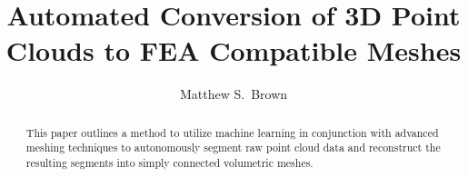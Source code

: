\documentclass[12pt]{drexelthesis}
\title{Automated Conversion of 3D Point Clouds to FEA Compatible Meshes}
\author{Matthew S.~Brown}
\begin{document}
\maketitle
\begin{preliminary}

\newpage

\setcounter{page}{2}

\date{} %

\begin{dedication}

\end{dedication}

\begin{acknowledgements}

\end{acknowledgements}


\mytableofcontents\newpage


\setlength{\baselineskip}{0.5\baselineskip}
\listoftables \newpage


\listoffigures \newpage
\setlength{\baselineskip}{2.0\baselineskip}

\begin{abstract}
This paper outlines a method to utilize machine learning in conjunction with advanced meshing techniques to autonomously segment raw point cloud data and reconstruct the resulting segments into simply connected volumetric meshes.

\end{abstract}

\clearpage
\end{preliminary}
\thispagestyle{empty}
\newpage
\

\setcounter{page}{0}
\end{document}
